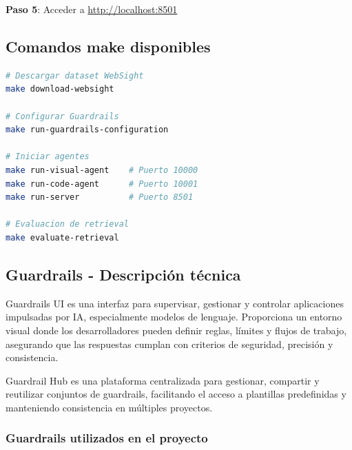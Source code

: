 \documentclass[12pt,a4paper]{article}
\begin{document}
\textbf{Paso 5}: Acceder a \url{http://localhost:8501}

\subsection{Comandos make disponibles}

\begin{lstlisting}[language=bash]
# Descargar dataset WebSight
make download-websight

# Configurar Guardrails
make run-guardrails-configuration

# Iniciar agentes
make run-visual-agent    # Puerto 10000
make run-code-agent      # Puerto 10001
make run-server          # Puerto 8501

# Evaluacion de retrieval
make evaluate-retrieval
\end{lstlisting}

\subsection{Guardrails - Descripción técnica}

Guardrails UI es una interfaz para supervisar, gestionar y controlar aplicaciones impulsadas por IA, especialmente modelos de lenguaje. Proporciona un entorno visual donde los desarrolladores pueden definir reglas, límites y flujos de trabajo, asegurando que las respuestas cumplan con criterios de seguridad, precisión y consistencia.

Guardrail Hub es una plataforma centralizada para gestionar, compartir y reutilizar conjuntos de guardrails, facilitando el acceso a plantillas predefinidas y manteniendo consistencia en múltiples proyectos.
\newpage
\subsubsection{Guardrails utilizados en el proyecto}

\setlength\LTleft{0pt}
\setlength\LTright{0pt}
\end{document}
